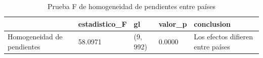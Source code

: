\begin{table}[htbp]
\centering
\caption{Prueba F de homogeneidad de pendientes entre países}
\begin{tabular}{lllll}
\hline
 & estadistico\_F & gl & valor\_p & conclusion \\
\hline
Homogeneidad de pendientes & 58.0971 & (9, 992) & 0.0000 & Los efectos difieren entre países \\
\hline
\end{tabular}
\label{tab:tabla9c_homogeneidad}
\end{table}